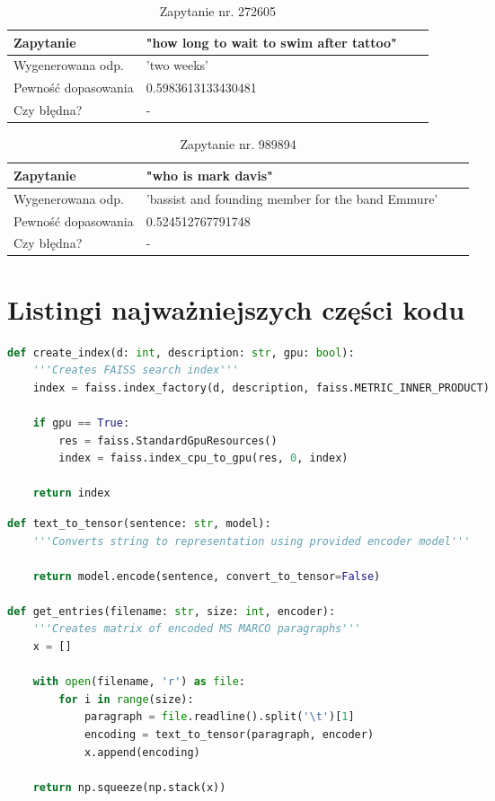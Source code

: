 \begin{table}[htp!]
\centering
\caption{Zapytanie nr. 272605}
\vspace*{5mm}
\begin{tabular}{llll}
   Zapytanie & "how long to wait to swim after tattoo"\\
   \hline
    Wygenerowana odp. & 'two weeks' \\
    \hline
    Pewność dopasowania & 0.5983613133430481\\
    \hline
    Czy błędna? & -\\
\end{tabular}
\end{table}

\begin{table}[htp!]
\centering
\caption{Zapytanie nr. 989894}
\vspace*{5mm}
\begin{tabular}{llll}
   Zapytanie & "who is mark davis"\\
   \hline
    Wygenerowana odp. & 'bassist and founding member for the band Emmure' \\
    \hline
    Pewność dopasowania & 0.524512767791748\\
    \hline
    Czy błędna? & -\\
\end{tabular}
\end{table}


\section{Listingi najważniejszych części kodu}

\begin{lstlisting}[language=Python, caption=Tworzenie indeksu] 
def create_index(d: int, description: str, gpu: bool):
    '''Creates FAISS search index'''
    index = faiss.index_factory(d, description, faiss.METRIC_INNER_PRODUCT)

    if gpu == True:
        res = faiss.StandardGpuResources()
        index = faiss.index_cpu_to_gpu(res, 0, index)

    return index
\end{lstlisting}

\begin{lstlisting}[language=Python, caption=Przetwarzanie zbioru danych]
def text_to_tensor(sentence: str, model):
    '''Converts string to representation using provided encoder model'''

    return model.encode(sentence, convert_to_tensor=False)

def get_entries(filename: str, size: int, encoder):
    '''Creates matrix of encoded MS MARCO paragraphs'''
    x = []

    with open(filename, 'r') as file:
        for i in range(size):
            paragraph = file.readline().split('\t')[1]
            encoding = text_to_tensor(paragraph, encoder)
            x.append(encoding)

    return np.squeeze(np.stack(x))
\end{lstlisting}

